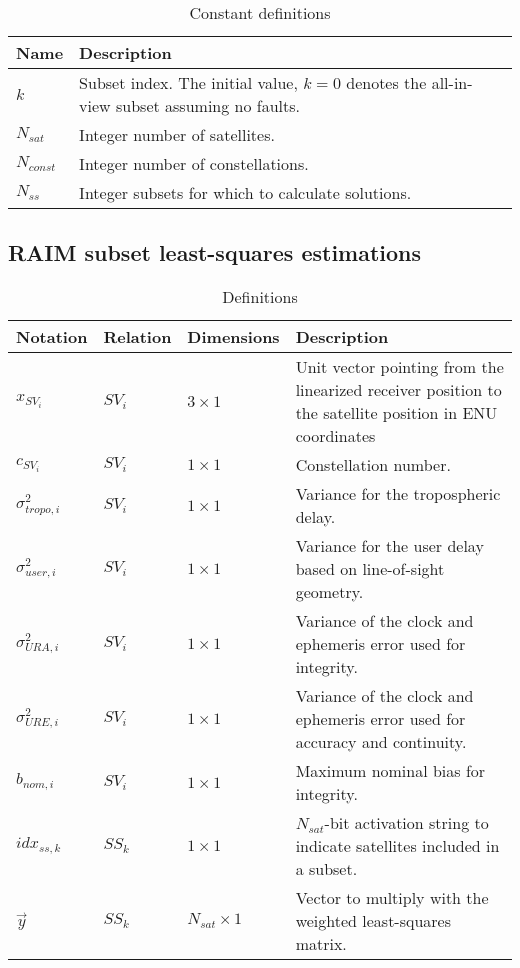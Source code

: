 \documentclass[11pt]{article}
\begin{document}
\begin{table}[htbp] \centering
  \caption{Constant definitions}\label{tab:exp}
  \begin{tabular}{|m{2cm}|m{11cm}|}
    \hline
    \textbf{Name} & \textbf{Description}\\ \hline
    $k$ & Subset index. The initial value, $k=0$ denotes the all-in-view subset assuming no faults.\\ \hline
    $N_{sat}$ & Integer number of satellites.\\ \hline
    $N_{const}$ & Integer number of constellations.\\ \hline
    $N_{ss}$ & Integer subsets for which to calculate solutions.\\ \hline
  \end{tabular}
\end{table}

\subsection{RAIM subset least-squares estimations}

\begin{table}[htbp] \centering
  \caption{Definitions}
  \begin{tabular}{|m{2cm}|m{2cm}|m{2cm}|m{7cm}|}
    \hline
    \textbf{Notation} & \textbf{Relation} & \textbf{Dimensions} & \textbf{Description}\\ \hline
    $x_{SV_i}$ & $SV_i$ & $3 \times 1$ & Unit vector pointing from the linearized receiver position to the satellite position in ENU coordinates\\ \hline
    $c_{SV_i}$ & $SV_i$ & $1 \times 1$ & Constellation number.\\ \hline
    $\sigma_{tropo,i}^2$ & $SV_i$ & $1 \times 1$ & Variance for the tropospheric delay.\\ \hline
    $\sigma_{user,i}^2$ & $SV_i$ & $1 \times 1$ & Variance for the user delay based on line-of-sight geometry.\\ \hline
    $\sigma_{URA,i}^2$ & $SV_i$ & $1 \times 1$ & Variance of the clock and ephemeris error used for integrity.\\ \hline
    $\sigma_{URE,i}^2$ & $SV_i$ & $1 \times 1$ & Variance of the clock and ephemeris error used for accuracy and continuity.\\ \hline
    $b_{nom,i}$ & $SV_i$ & $1 \times 1$ & Maximum nominal bias for integrity.\\ \hline
    $idx_{ss,k}$ & $SS_k$ & $1 \times 1$ & $N_{sat}$-bit activation string to indicate satellites included in a subset.\\ \hline
    $\vec{y}$ & $SS_k$ & $N_{sat} \times 1$ & Vector to multiply with the weighted least-squares matrix.\\ \hline
  \end{tabular}
\end{table}
\end{document}
